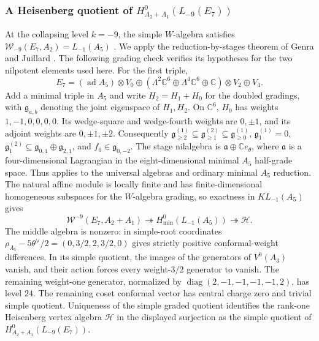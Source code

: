 \documentclass[11pt,a4paper]{amsart}
\numberwithin{equation}{section}
\theoremstyle{definition}
\theoremstyle{remark}
\newcommand{\C}{\mathbb C}
\newcommand{\g}{\mathfrak g}
\newcommand{\ad}{\operatorname{ad}}
\begin{document}
\subsubsection{\texorpdfstring{A Heisenberg quotient of $H^0_{A_2+A_1}(L_{-9}(E_7))$}{A Heisenberg quotient of the A2+A1 reduction of L-9(E7)}}
At the collapsing level $k=-9$, the simple $W$-algebra satisfies
$\mathcal W_{-9}(E_7,A_2)=L_{-1}(A_5)$
\cite[arXiv v3, Table 8, $A_2$ row]{AdamovicEtAl2026}.
We apply the reduction-by-stages theorem of Genra and Juillard
\cite[Theorem~5.3.4]{GenraJuillard2025}. The following grading check verifies its
hypotheses for the two nilpotent elements used here.
For the first triple,
$$
 E_7=(\ad A_5)\otimes V_0\oplus
       (\Lambda^2\C^6\oplus\Lambda^4\C^6\oplus\C)\otimes V_2
       \oplus V_4.
$$
Add a minimal triple in $A_5$ and write $H_2=H_1+H_0$ for the
doubled gradings, with $\g_{a,b}$ denoting the joint eigenspace of
$H_1,H_2$. On $\C^6$, $H_0$ has weights $1,-1,0,0,0,0$.
Its wedge-square and wedge-fourth weights are $0,\pm1$, and its
adjoint weights are $0,\pm1,\pm2$. Consequently
$\g^{(1)}_{\ge2}\subseteq\g^{(2)}_{\ge1}\subseteq\g^{(1)}_{\ge0}$,
$\g^{(1)}_1=0$, $\g^{(2)}_1\subseteq\g_{0,1}\oplus\g_{2,1}$,
and $f_0\in\g_{0,-2}$. The stage nilalgebra is
$\mathfrak a\oplus\C e_\theta$, where $\mathfrak a$ is a
four-dimensional Lagrangian in the eight-dimensional minimal
$A_5$ half-grade space. Thus \cite[Theorem 5.3.4]{GenraJuillard2025}
applies to the universal algebras and ordinary minimal $A_5$ reduction.
The natural affine module is locally finite and has finite-dimensional
homogeneous subspaces for the $W$-algebra grading, so exactness in $KL_{-1}(A_5)$ gives
$$
 \mathcal W^{-9}(E_7,A_2+A_1)\twoheadrightarrow
 H^0_{\min}(L_{-1}(A_5))\twoheadrightarrow\mathcal H.
$$
The middle algebra is nonzero: in simple-root coordinates
$\rho_{A_5}-5\theta^\vee/2=(0,3/2,2,3/2,0)$ gives strictly positive conformal-weight differences.
In its simple quotient, the images of the generators of $V^0(A_3)$
vanish, and their action forces every weight-$3/2$ generator to vanish.
The remaining weight-one generator, normalized by
$\operatorname{diag}(2,-1,-1,-1,-1,2)$, has level $24$. The remaining
coset conformal vector has central charge zero and trivial simple quotient.
Uniqueness of the simple graded quotient identifies the rank-one
Heisenberg vertex algebra $\mathcal H$ in the displayed surjection as
the simple quotient of $H^0_{A_2+A_1}(L_{-9}(E_7))$.
\end{document}

